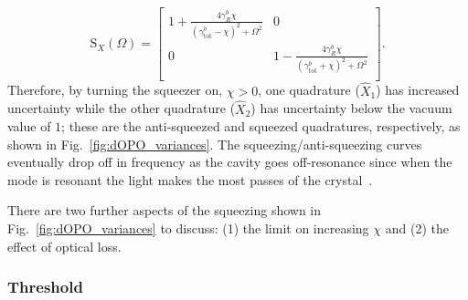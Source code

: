 \begin{equation} \label{eq:dOPO_fixed_phase}
\text{S}_X(\Omega)=\left[
\begin{array}{cc}
 1+\frac{4 \gamma^b_R \chi}{\left({\gamma^b_\text{tot}}-\chi\right)^2+\Omega ^2}
 & 0 \\
 0
 & 1-\frac{4 \gamma^b_R \chi}{\left({\gamma^b_\text{tot}}+\chi\right)^2+\Omega ^2} \\
\end{array}
\right].
\end{equation}
Therefore, by turning the squeezer on, $\chi>0$, one quadrature ($\hat X_1$) has increased uncertainty while the other quadrature ($\hat X_2$) has uncertainty below the vacuum value of $1$; these are the anti-squeezed and squeezed quadratures, respectively, as shown in Fig.~\ref{fig:dOPO_variances}. The squeezing/anti-squeezing curves eventually drop off in frequency as the cavity goes off-resonance since when the mode is resonant the light makes the most passes of the crystal~\cite{}. %

There are two further aspects of the squeezing shown in Fig.~\ref{fig:dOPO_variances} to discuss: (1) the limit on increasing $\chi$ and (2) the effect of optical loss.

\subsubsection{Threshold}
\label{sec:dOPO_threshold}

